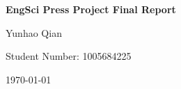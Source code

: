 \documentclass[../main.tex]{subfiles}
\begin{document}
\centering

\vspace*{1.5in}

\begin{Huge}
	\textbf{EngSci Press Project Final Report}
\end{Huge}

\vspace{1in}

\begin{Large}
	Yunhao Qian
\end{Large}

\vspace{0.3in}

\begin{Large}
	Student Number: 1005684225
\end{Large}

\vspace{\fill}

\begin{Large}
	\today
\end{Large}

\vspace*{1.5in}
\end{document}
